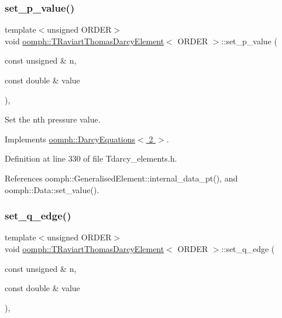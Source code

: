 \subsubsection{\texorpdfstring{set\+\_\+p\+\_\+value()}{set\_p\_value()}}
{\footnotesize\ttfamily template$<$unsigned O\+R\+D\+ER$>$ \\
void \hyperlink{classoomph_1_1TRaviartThomasDarcyElement}{oomph\+::\+T\+Raviart\+Thomas\+Darcy\+Element}$<$ O\+R\+D\+ER $>$\+::set\+\_\+p\+\_\+value (\begin{DoxyParamCaption}\item[{const unsigned \&}]{n,  }\item[{const double \&}]{value }\end{DoxyParamCaption})\hspace{0.3cm}{\ttfamily [inline]}, {\ttfamily [virtual]}}



Set the nth pressure value. 



Implements \hyperlink{classoomph_1_1DarcyEquations_a7c950999d5108350bd8a44f4ab286b2c}{oomph\+::\+Darcy\+Equations$<$ 2 $>$}.



Definition at line 330 of file Tdarcy\+\_\+elements.\+h.



References oomph\+::\+Generalised\+Element\+::internal\+\_\+data\+\_\+pt(), and oomph\+::\+Data\+::set\+\_\+value().

\mbox{\label{classoomph_1_1TRaviartThomasDarcyElement_ad4d0783e51faa448cbbd1978bf4779df}} 
\subsubsection{\texorpdfstring{set\+\_\+q\+\_\+edge()}{set\_q\_edge()}}
{\footnotesize\ttfamily template$<$unsigned O\+R\+D\+ER$>$ \\
void \hyperlink{classoomph_1_1TRaviartThomasDarcyElement}{oomph\+::\+T\+Raviart\+Thomas\+Darcy\+Element}$<$ O\+R\+D\+ER $>$\+::set\+\_\+q\+\_\+edge (\begin{DoxyParamCaption}\item[{const unsigned \&}]{n,  }\item[{const double \&}]{value }\end{DoxyParamCaption})\hspace{0.3cm}{\ttfamily [inline]}, {\ttfamily [virtual]}}



